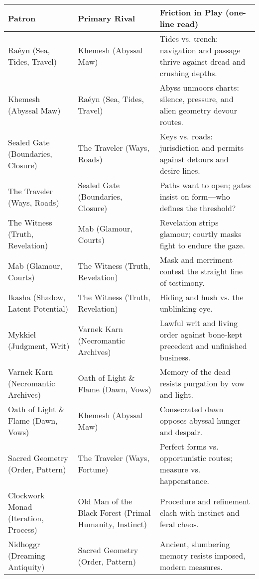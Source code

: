 \begin{table}[h!]
  \centering
  \renewcommand{\arraystretch}{1.15}
  \begin{tabular}{@{}p{3.4cm}p{3.4cm}p{8.2cm}@{}}
    \toprule
    \textbf{Patron} & \textbf{Primary Rival} & \textbf{Friction in Play (one-line read)} \\
    \midrule
    Raéyn (Sea, Tides, Travel) & Khemesh (Abyssal Maw) & Tides vs. trench: navigation and passage thrive against dread and crushing depths. \\
    Khemesh (Abyssal Maw) & Raéyn (Sea, Tides, Travel) & Abyss unmoors charts: silence, pressure, and alien geometry devour routes. \\
    Sealed Gate (Boundaries, Closure) & The Traveler (Ways, Roads) & Keys vs. roads: jurisdiction and permits against detours and desire lines. \\
    The Traveler (Ways, Roads) & Sealed Gate (Boundaries, Closure) & Paths want to open; gates insist on form—who defines the threshold? \\
    The Witness (Truth, Revelation) & Mab (Glamour, Courts) & Revelation strips glamour; courtly masks fight to endure the gaze. \\
    Mab (Glamour, Courts) & The Witness (Truth, Revelation) & Mask and merriment contest the straight line of testimony. \\
    Ikasha (Shadow, Latent Potential) & The Witness (Truth, Revelation) & Hiding and hush vs. the unblinking eye. \\
    Mykkiel (Judgment, Writ) & Varnek Karn (Necromantic Archives) & Lawful writ and living order against bone-kept precedent and unfinished business. \\
    Varnek Karn (Necromantic Archives) & Oath of Light \& Flame (Dawn, Vows) & Memory of the dead resists purgation by vow and light. \\
    Oath of Light \& Flame (Dawn, Vows) & Khemesh (Abyssal Maw) & Consecrated dawn opposes abyssal hunger and despair. \\
    Sacred Geometry (Order, Pattern) & The Traveler (Ways, Fortune) & Perfect forms vs. opportunistic routes; measure vs. happenstance. \\
    Clockwork Monad (Iteration, Process) & Old Man of the Black Forest (Primal Humanity, Instinct) & Procedure and refinement clash with instinct and feral chaos. \\
    Nidhoggr (Dreaming Antiquity) & Sacred Geometry (Order, Pattern) & Ancient, slumbering memory resists imposed, modern measures. \\

\end{tabular}
\end{table}
